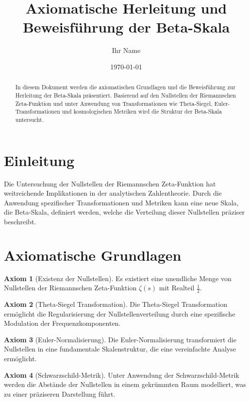 \documentclass[a4paper,12pt]{article}
\title{Axiomatische Herleitung und Beweisführung der Beta-Skala}
\author{Ihr Name}
\date{\today}
\theoremstyle{definition}
\newtheorem{axiom}{Axiom}
\begin{document}
\maketitle

\begin{abstract}
In diesem Dokument werden die axiomatischen Grundlagen und die Beweisführung zur Herleitung der Beta-Skala präsentiert. Basierend auf den Nullstellen der Riemannschen Zeta-Funktion und unter Anwendung von Transformationen wie Theta-Siegel, Euler-Transformationen und kosmologischen Metriken wird die Struktur der Beta-Skala untersucht.
\end{abstract}

\tableofcontents

\section{Einleitung}
Die Untersuchung der Nullstellen der Riemannschen Zeta-Funktion hat weitreichende Implikationen in der analytischen Zahlentheorie. Durch die Anwendung spezifischer Transformationen und Metriken kann eine neue Skala, die Beta-Skala, definiert werden, welche die Verteilung dieser Nullstellen präziser beschreibt.

\section{Axiomatische Grundlagen}
\begin{axiom}[Existenz der Nullstellen]
Es existiert eine unendliche Menge von Nullstellen der Riemannschen Zeta-Funktion $\zeta(s)$ mit Realteil $\frac{1}{2}$.
\end{axiom}

\begin{axiom}[Theta-Siegel Transformation]
Die Theta-Siegel Transformation ermöglicht die Regularisierung der Nullstellenverteilung durch eine spezifische Modulation der Frequenzkomponenten.
\end{axiom}

\begin{axiom}[Euler-Normalisierung]
Die Euler-Normalisierung transformiert die Nullstellen in eine fundamentale Skalenstruktur, die eine vereinfachte Analyse ermöglicht.
\end{axiom}

\begin{axiom}[Schwarzschild-Metrik]
Unter Anwendung der Schwarzschild-Metrik werden die Abstände der Nullstellen in einem gekrümmten Raum modelliert, was zu einer präziseren Darstellung führt.
\end{axiom}
\end{document}
